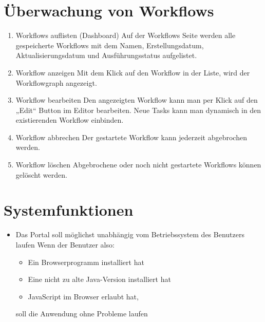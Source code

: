         \section{Überwachung von Workflows}
        
        \begin{enumerate}[font={\bfseries}, label={FA\arabic*}0, wide=0pt, labelindent=1em, leftmargin=*, resume]
            
            \item  \label{workflowAuflisten:1} Workflows auflisten (Dashboard)\newline
            Auf der Workflows Seite werden alle gespeicherte Workflows mit dem Namen, Erstellungsdatum, Aktualisierungsdatum und Ausführungsstatus aufgelistet.
            
            \item  \label{workflowWiederherstellen:1} Workflow anzeigen \newline
            Mit dem Klick auf den Workflow in der Liste, wird der Workflowgraph angezeigt.
            
            \item  \label{workflowBearbeiten:1} Workflow bearbeiten \newline
            Den angezeigten Workflow kann man per Klick auf den „Edit“ Button im Editor bearbeiten. Neue Tasks kann man dynamisch in den existierenden Workflow einbinden.
            
            \item \label{workflowAbbrechen:1} Workflow abbrechen \newline
            Der gestartete Workflow kann jederzeit abgebrochen werden.
            
            \item  \label{workflowLoeschen:1} Workflow löschen \newline
            Abgebrochene oder noch nicht gestartete Workflows können gelöscht werden.
            
        \end{enumerate}
        
    \section{Systemfunktionen}
        \begin{itemize}
            \item Das Portal soll möglichst unabhängig vom Betriebssystem des Benutzers laufen\newline
                Wenn der Benutzer also:
                \begin{itemize}
                    \item Ein Browserprogramm installiert hat
                    \item Eine nicht zu alte Java-Version installiert hat
                    \item JavaScript im Browser erlaubt hat,
                \end{itemize}
                soll die Anwendung ohne Probleme laufen
        \end{itemize}
        
        
